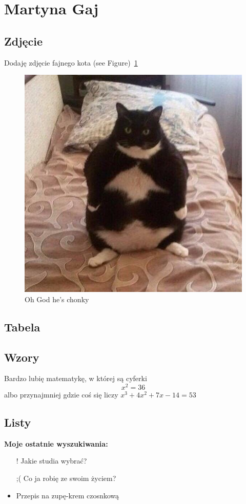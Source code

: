 \section {Martyna Gaj}
\label{sec:Martyna Gaj}

\subsection{Zdjęcie}
Dodaję zdjęcie fajnego kota
(see Figure)~\ref{fig:Chonk}
\begin{figure}[htbp]
 \centering
 \includegraphics[scale= 0.5]{pictures/Chonk.jpg} 
 \caption{Oh God he's chonky}
 \label{fig:Chonk}
\end{figure}

\subsection{Tabela}
\label{tab:marg}


\subsection{Wzory}
Bardzo lubię matematykę, w której są cyferki
\[x^2=36\]
albo przynajmniej gdzie coś się liczy
$ x^3 + 4x^2 + 7x -14 = 53 $

\subsection{Listy}
\textbf{Moje ostatnie wyszukiwania:}
\begin{itemize}
    \item[!] Jakie studia wybrać?
    \item[;(] Co ja robię ze swoim życiem?
    \item Przepis na zupę-krem czosnkową
\end{itemize}

